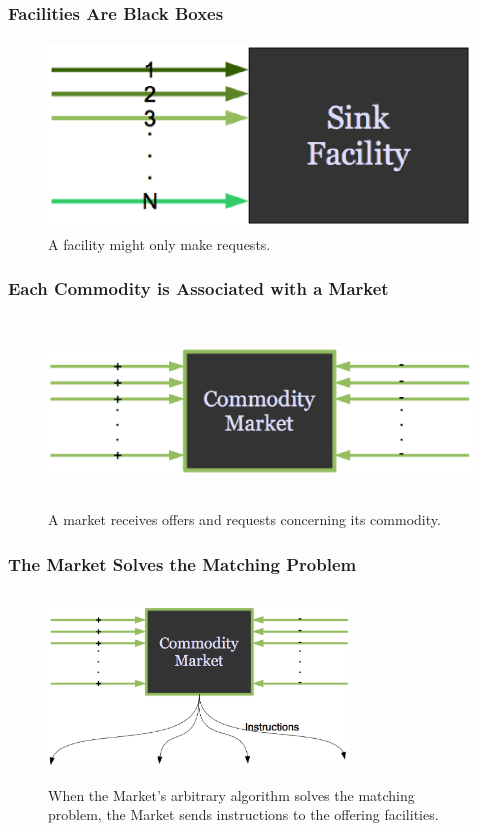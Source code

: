 \begin{frame}[ctb!]
  \frametitle{Facilities Are Black Boxes}
  \begin{figure}[htbp!]
    \begin{center}
      \includegraphics[height=5cm]{./images/sinkfacility.eps}
    \end{center}
    \caption{ A facility might only make requests.} 
    \label{fig:sinkfacility}
  \end{figure}
\end{frame}
\begin{frame}[ctb!]
  \frametitle{Each Commodity is Associated with a Market}
  \begin{figure}[htbp!]
    \begin{center}
      \includegraphics[height=5cm]{./images/market.eps}
    \end{center}
    \caption{ A market receives offers and requests concerning its 
    commodity. } 
    \label{fig:market}
  \end{figure}
\end{frame}
\begin{frame}[ctb!]
  \frametitle{The Market Solves the Matching Problem}
  \begin{figure}[htbp!]
    \begin{center}
      \includegraphics[height=5cm,width=8cm]{./images/instructions.eps}
    \end{center}
    \caption{ When the Market's arbitrary algorithm solves the 
    matching problem, the Market sends instructions to the offering 
    facilities.} 
    \label{fig:instructions}
  \end{figure}
\end{frame}
